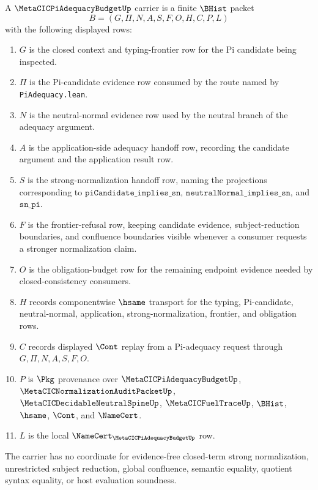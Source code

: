 \begin{definition}
\label{def:metacic-pi-adequacy-budget-carrier}
A $\MetaCICPiAdequacyBudgetUp$ carrier is a finite $\BHist$ packet
$$
B=(G,\Pi,N,A,S,F,O,H,C,P,L)
$$
with the following displayed rows:
\begin{enumerate}
\item $G$ is the closed context and typing-frontier row for the Pi candidate being inspected.
\item $\Pi$ is the Pi-candidate evidence row consumed by the route named by \texttt{PiAdequacy.lean}.
\item $N$ is the neutral-normal evidence row used by the neutral branch of the adequacy argument.
\item $A$ is the application-side adequacy handoff row, recording the candidate argument and the application result row.
\item $S$ is the strong-normalization handoff row, naming the projections corresponding to $\texttt{piCandidate\_implies\_sn}$, $\texttt{neutralNormal\_implies\_sn}$, and $\texttt{sn\_pi}$.
\item $F$ is the frontier-refusal row, keeping candidate evidence, subject-reduction boundaries, and confluence boundaries visible whenever a consumer requests a stronger normalization claim.
\item $O$ is the obligation-budget row for the remaining endpoint evidence needed by closed-consistency consumers.
\item $H$ records componentwise $\hsame$ transport for the typing, Pi-candidate, neutral-normal, application, strong-normalization, frontier, and obligation rows.
\item $C$ records displayed $\Cont$ replay from a Pi-adequacy request through $G,\Pi,N,A,S,F,O$.
\item $P$ is $\Pkg$ provenance over $\MetaCICPiAdequacyBudgetUp$, $\MetaCICNormalizationAuditPacketUp$, $\MetaCICDecidableNeutralSpineUp$, $\MetaCICFuelTraceUp$, $\BHist$, $\hsame$, $\Cont$, and $\NameCert$.
\item $L$ is the local $\NameCert_{\MetaCICPiAdequacyBudgetUp}$ row.
\end{enumerate}
The carrier has no coordinate for evidence-free closed-term strong normalization, unrestricted subject reduction, global confluence, semantic equality, quotient syntax equality, or host evaluation soundness.
\end{definition}

